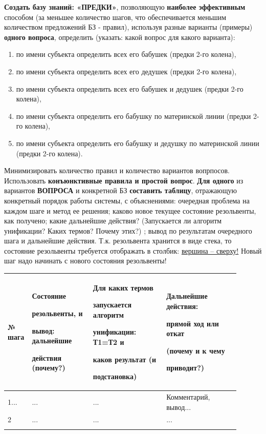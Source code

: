 \documentclass[a4paper,12pt]{article}
\begin{document}
	{\bf Создать базу знаний: «ПРЕДКИ»}, позволяющую {\bf наиболее эффективным} способом (за меньшее количество шагов, что обеспечивается меньшим количеством предложений БЗ - правил), используя разные варианты (примеры) {\bf одного вопроса}, определить (указать: какой вопрос для какого варианта):
	\begin{enumerate}
		\item по имени субъекта определить всех его бабушек (предки 2-го колена),
		\item по имени субъекта определить всех его дедушек (предки 2-го колена),
		\item по имени субъекта определить всех его бабушек и дедушек (предки 2-го колена),
		\item по имени субъекта определить его бабушку по материнской линии (предки 2-го колена),
		\item по имени субъекта определить его бабушку и дедушку по материнской линии (предки 2-го колена).
	\end{enumerate}

	Минимизировать количество правил и количество вариантов вопрпосов. Использовать {\bf конъюнктивные правила и простой вопрос}.
	{\bf Для одного} из вариантов {\bf ВОПРОСА} и конкретной БЗ {\bf составить таблицу}, отражающую конкретный порядок работы системы, с объяснениями: 
	очередная проблема на каждом шаге и метод ее решения; 
	каково новое текущее состояние резольвенты, как получено;
	какие дальнейшие действия? (Запускается ли алгоритм унификации? Каких термов? Почему этих?) ;
	вывод по результатам очередного шага и дальнейшие действия.
	Т.к. резольвента хранится в виде стека, то состояние резольвенты требуется отображать в столбик: \underline{вершина – сверху!} Новый шаг надо начинать с нового состояния резольвенты!
	
	\begin{center}
		\begin{longtable}[h!]{|p{0.05\linewidth}|p{0.25\linewidth}|p{ 0.3\linewidth}|p{ 0.3\linewidth}|}
			\hline
			{№ шага} & {Состояние 
				
				резольвенты, и 
				
				вывод: дальнейшие 
				
				действия (почему?)} & {Для каких термов 
				
				запускается алгоритм 
				
				унификации: Т1=Т2 и 
				
				каков {\bf результат} (и 
				
				подстановка)} & {Дальнейшие действия: 
				
				прямой ход или откат 
				
				(почему и к чему 
				
				приводит?)}\\
			\hline
			{1...} & {...} & {...} & {Комментарий, вывод...}\\
			\hline
			{2} & {...} & {...} & {...}\\
			\hline
			\label{m1}
		\end{longtable}
	\end{center}
\end{document}
